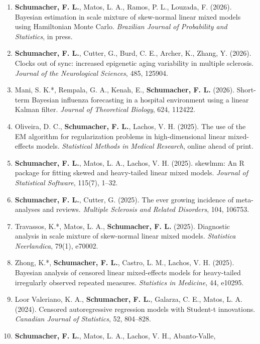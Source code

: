 \documentclass[
  10pt,
  letterpaper,
]{article}
\providecommand{\tightlist}{%
  \setlength{\itemsep}{0pt}\setlength{\parskip}{0pt}}
\begin{document}
\begin{enumerate}
\def\labelenumi{\arabic{enumi}.}
\tightlist
\item
  \textbf{Schumacher, F. L.}, Matos, L. A., Ramos, P. L., Louzada, F.
  (2026). Bayesian estimation in scale mixture of skew-normal linear
  mixed models using Hamiltonian Monte Carlo. \emph{Brazilian Journal of
  Probability and Statistics}, in press.
\item
  \textbf{Schumacher, F. L.}, Cutter, G., Burd, C. E., Archer, K.,
  Zhang, Y. (2026). Clocks out of sync: increased epigenetic aging
  variability in multiple sclerosis. \emph{Journal of the Neurological
  Sciences}, 485, 125904.
\item
  Mani, S. K.*, Rempala, G. A., Kenah, E., \textbf{Schumacher, F. L.}
  (2026). Short-term Bayesian influenza forecasting in a hospital
  environment using a linear Kalman filter. \emph{Journal of Theoretical
  Biology}, 624, 112422.
\item
  Oliveira, D. C., \textbf{Schumacher, F. L.}, Lachos, V. H. (2025). The
  use of the EM algorithm for regularization problems in
  high-dimensional linear mixed-effects models. \emph{Statistical
  Methods in Medical Research}, online ahead of print.
\item
  \textbf{Schumacher, F. L.}, Matos, L. A., Lachos, V. H. (2025).
  skewlmm: An R package for fitting skewed and heavy-tailed linear mixed
  models. \emph{Journal of Statistical Software}, 115(7), 1--32.
\item
  \textbf{Schumacher, F. L.}, Cutter, G. (2025). The ever growing
  incidence of meta-analyses and reviews. \emph{Multiple Sclerosis and
  Related Disorders}, 104, 106753.
\item
  Travassos, K.*, Matos, L. A., \textbf{Schumacher, F. L.} (2025).
  Diagnostic analysis in scale mixture of skew-normal linear mixed
  models. \emph{Statistica Neerlandica}, 79(1), e70002.
\item
  Zhong, K.*, \textbf{Schumacher, F. L.}, Castro, L. M., Lachos, V. H.
  (2025). Bayesian analysis of censored linear mixed-effects models for
  heavy-tailed irregularly observed repeated measures. \emph{Statistics
  in Medicine}, 44, e10295.
\item
  Loor Valeriano, K. A., \textbf{Schumacher, F. L.}, Galarza, C. E.,
  Matos, L. A. (2024). Censored autoregressive regression models with
  Student-t innovations. \emph{Canadian Journal of Statistics}, 52,
  804--828.
\item
  \textbf{Schumacher, F. L.}, Matos, L. A., Lachos, V. H., Abanto-Valle,

\end{enumerate}
\end{document}
